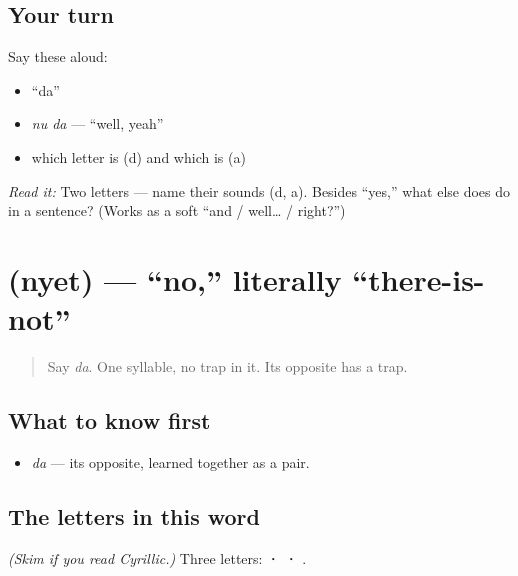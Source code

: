 \subsection*{Your turn}
Say these aloud:

\begin{itemize}
\raggedright
  \item \textquotedblleft{}da\textquotedblright{}
  \item \emph{nu da} — \textquotedblleft{}well, yeah\textquotedblright{}
  \item which letter is  (d) and which is  (a)
\end{itemize}

\begin{tcolorbox}[breakable,colback=teal!4,colframe=teal!35!black,title={Before you move on}]
\emph{Read it:} \textbf{} Two letters — name their sounds (d, a). Besides \textquotedblleft{}yes,\textquotedblright{} what else does \emph{} do in a sentence? (Works as a soft \textquotedblleft{}and / well… / right?\textquotedblright{})
\end{tcolorbox}
\section[\texorpdfstring{\ru{нет} (nyet)}{нет (nyet)}]{ (nyet) — \textquotedblleft{}no,\textquotedblright{} literally \textquotedblleft{}there-is-not\textquotedblright{}}

\label{lesson:RU-C01-net}



\begin{quote}
Say \emph{da}. One syllable, no trap in it. Its opposite has a trap.
\end{quote}

\subsection*{What to know first}
\begin{itemize}
\raggedright
  \item \emph{da} — its opposite, learned together as a pair.
\end{itemize}

\subsection*{The letters in this word}
\emph{(Skim if you read Cyrillic.)} Three letters: \textbf{ ·  · }.

